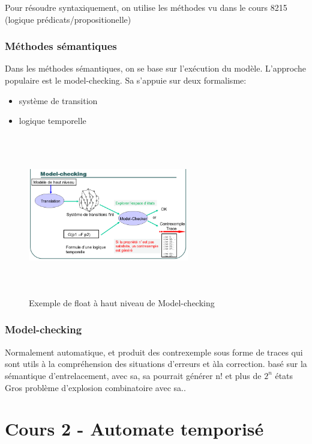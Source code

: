 \documentclass[oneside]{book}
\begin{document}
    Pour résoudre syntaxiquement, on utilise les méthodes vu dans le cours 8215 (logique prédicats/propositionelle)\\
    
    \subsection{Méthodes sémantiques}
    Dans les méthodes sémantiques, on se base sur l'exécution du modèle. L'approche populaire est le model-checking. Sa s'appuie sur deux formalisme:
    \begin{itemize}
        \item système de transition
        \item logique temporelle
    \end{itemize}

    \begin{figure}[!ht]
    	\centering
    	\includegraphics[width = 7cm, height = 7cm, keepaspectratio]{Images/flot_model_checking.png}
    	\caption{Exemple de float à haut niveau de Model-checking}
    	\label{fig:ModelChecking}
    \end{figure}
    
    \subsection{Model-checking}
    Normalement automatique, et produit des contrexemple sous forme de traces qui sont utils à la compréhension des situations d'erreurs et àla correction. basé sur la sémantique d'entrelacement, avec sa, sa pourrait générer n! et plus de $2^{n}$ états\\
    
    Gros problème d'explosion combinatoire avec sa..\\
    
    \chapter{Cours 2 - Automate temporisé}
\end{document}
